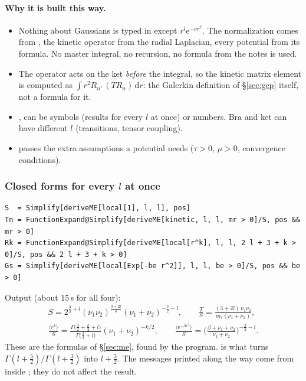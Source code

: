 \documentclass[11pt,a4paper]{article}
\numberwithin{equation}{section}
\theoremstyle{definition}
\theoremstyle{plain}
\theoremstyle{remark}
\numberwithin{algorithm}{section}
\newcommand{\dd}{\mathrm{d}}
\newcommand{\ee}{\mathrm{e}}
\newcommand{\mr}{m_r}
\begin{document}
\paragraph{Why it is built this way.}
\begin{itemize}[leftmargin=1.3em,itemsep=2pt]
\item Nothing about Gaussians is typed in except $r^l\ee^{-\nu r^2}$. The normalization comes from , the kinetic operator from the radial Laplacian, every potential from its formula. No master integral, no recursion, no formula from the notes is used.
\item The operator acts on the ket \emph{before} the integral, so the kinetic matrix element is computed as $\int r^2R_{n'}\,(TR_n)\,\dd r$: the Galerkin definition of \S\ref{sec:gep} itself, not a formula for it.
\item {},  can be symbols (results for every $l$ at once) or numbers. Bra and ket can have different $l$ (transitions, tensor coupling).
\item {} passes the extra assumptions a potential needs ($\tau>0$, $\mu>0$, convergence conditions).
\end{itemize}

\subsubsection{Closed forms for every \texorpdfstring{$l$}{l} at once}
\begin{lstlisting}[style=wl]
S  = Simplify[deriveME[local[1], l, l], pos]
Tn = FunctionExpand@Simplify[deriveME[kinetic, l, l, mr > 0]/S, pos && mr > 0]
Rk = FunctionExpand@Simplify[deriveME[local[r^k], l, l, 2 l + 3 + k > 0]/S, pos && 2 l + 3 + k > 0]
Gs = Simplify[deriveME[local[Exp[-be r^2]], l, l, be > 0]/S, pos && be > 0]
\end{lstlisting}
Output (about $15\,$s for all four):
\[
\begin{gathered}
S=2^{\frac32+l}(\nu_1\nu_2)^{\frac{3+2l}4}(\nu_1+\nu_2)^{-\frac32-l},\qquad
\frac{T}{S}=\frac{(3+2l)\,\nu_1\nu_2}{\mr(\nu_1+\nu_2)},\\
\frac{\langle r^k\rangle}{S}=\frac{\Gamma\big(\frac32+\frac k2+l\big)}{\Gamma\big(\frac32+l\big)}(\nu_1+\nu_2)^{-k/2},\qquad
\frac{\langle\ee^{-\beta r^2}\rangle}{S}=\Big(\frac{\beta+\nu_1+\nu_2}{\nu_1+\nu_2}\Big)^{-\frac32-l}.
\end{gathered}
\]
These are the formulas of \S\ref{sec:me}, found by the program.  is what turns $\Gamma(l+\frac52)/\Gamma(l+\frac32)$ into $l+\frac32$. The  messages printed along the way come from inside ; they do not affect the result.
\end{document}
